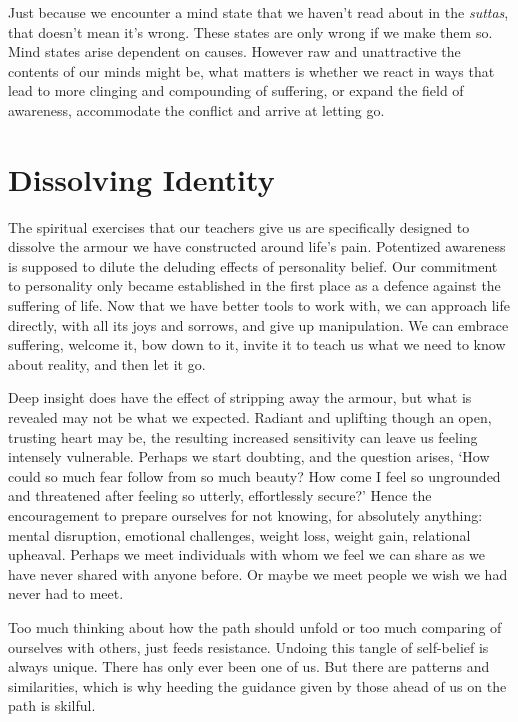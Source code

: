 Just because we encounter a mind state that we haven’t read about in the
\emph{suttas}, that doesn’t mean it’s wrong. These states are only wrong if
we make them so. Mind states arise dependent on causes. However raw and
unattractive the contents of our minds might be, what matters is whether
we react in ways that lead to more clinging and compounding of
suffering, or expand the field of awareness, accommodate the conflict
and arrive at letting go.

\section{Dissolving Identity}

The spiritual exercises that our teachers give us are specifically
designed to dissolve the armour we have constructed around life’s pain.
Potentized awareness is supposed to dilute the deluding effects of
personality belief. Our commitment to personality only became
established in the first place as a defence against the suffering of
life. Now that we have better tools to work with, we can approach life
directly, with all its joys and sorrows, and give up manipulation. We
can embrace suffering, welcome it, bow down to it, invite it to teach us
what we need to know about reality, and then let it go.

Deep insight does have the effect of stripping away the armour, but what
is revealed may not be what we expected. Radiant and uplifting though an
open, trusting heart may be, the resulting increased sensitivity can
leave us feeling intensely vulnerable. Perhaps we start doubting, and
the question arises, ‘How could so much fear follow from so much beauty?
How come I feel so ungrounded and threatened after feeling so utterly,
effortlessly secure?’ Hence the encouragement to prepare ourselves for
not knowing, for absolutely anything: mental disruption, emotional
challenges, weight loss, weight gain, relational upheaval. Perhaps we
meet individuals with whom we feel we can share as we have never shared
with anyone before. Or maybe we meet people we wish we had never had to
meet.

\enlargethispage*{\baselineskip}

Too much thinking about how the path should unfold or too much comparing
of ourselves with others, just feeds resistance. Undoing this tangle of
self-belief is always unique. There has only ever been one of us. But
there are patterns and similarities, which is why heeding the guidance
given by those ahead of us on the path is skilful.

